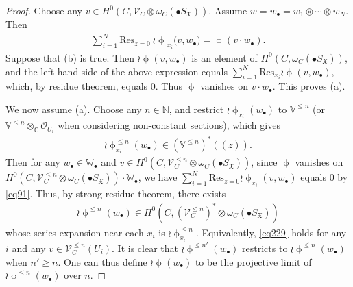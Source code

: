\documentclass[12pt,b5paper,notitlepage]{report}
\theoremstyle{definition}
\theoremstyle{plain}
\newcommand{\fk}{\mathfrak}
\newcommand{\Res}{\mathrm{Res}}
\newcommand{\scr}{\mathscr}
\newcommand{\blt}{\bullet}
\newcommand{\Vbb}{\mathbb V}
\newcommand{\Wbb}{\mathbb W}
\newcommand{\Cbb}{\mathbb C}
\newcommand{\Nbb}{\mathbb N}
\numberwithin{equation}{section}
\begin{document}
\begin{proof}
Choose any $v\in H^0(C,\scr V_C\otimes\omega_C(\blt S_{\fk X}))$. Assume $w=w_\blt=w_1\otimes\cdots\otimes w_N$. Then 
\begin{align}
\sum_{i=1}^N\Res_{z=0}~ {\wr\upphi}_{x_i}\big(v,w_\blt\big)=\upphi(v\cdot w_\blt).\label{eq91}
\end{align}
Suppose that (b) is true. Then  $\wr\upphi(v,w_\blt)$ is an element of $H^0(C,\omega_C(\blt S_{\fk X}))$, and the left hand side of the above expression equals $\sum_{i=1}^N \Res_{x_i}\wr\upphi(v,w_\blt)$, which, by residue theorem, equals $0$. Thus $\upphi$ vanishes on $v\cdot w_\blt$. This proves (a).

We now assume (a). Choose any $n\in\Nbb$, and restrict $\wr\upphi_{x_i}(w_\blt)$ to $\Vbb^{\leq n}$ (or $\Vbb^{\leq n}\otimes_{\Cbb}\scr O_{U_i}$ when considering non-constant sections), which gives
\begin{align*}
\wr\upphi_{x_i}^{\leq n}(w_\blt)\in (\Vbb^{\leq n})^*((z)).
\end{align*}
Then for any $w_\blt\in\Wbb_\blt$ and $v\in H^0(C,\scr V_C^{\leq n}\otimes\omega_C(\blt S_{\fk X}))$, since $\upphi$ vanishes on $H^0(C,\scr V_C^{\leq n}\otimes\omega_C(\blt S_{\fk X}))\cdot \Wbb_\blt$, we have $\sum_{i=1}^N \Res_{z=0}\wr\upphi_{x_i}(v,w_\blt)$ equals $0$ by \eqref{eq91}. Thus, by strong residue theorem, there exists
\begin{align*}
\wr\upphi^{\leq n}(w_\blt)\in H^0(C,(\scr V_C^{\leq n})^*\otimes\omega_C(\blt S_{\fk X}))
\end{align*}
whose series expansion near each $x_i$ is $\wr\upphi_{x_i}^{\leq n}$. Equivalently, \eqref{eq229} holds for any $i$ and any $v\in\scr V_C^{\leq n}(U_i)$. It is clear that $\wr\upphi^{\leq n'}(w_\blt)$ restricts to $\wr\upphi^{\leq n}(w_\blt)$ when $n'\geq n$. One can thus define $\wr\upphi(w_\blt)$ to be the projective limit of $\wr\upphi^{\leq n}(w_\blt)$ over $n$.
\end{proof}
\end{document}
